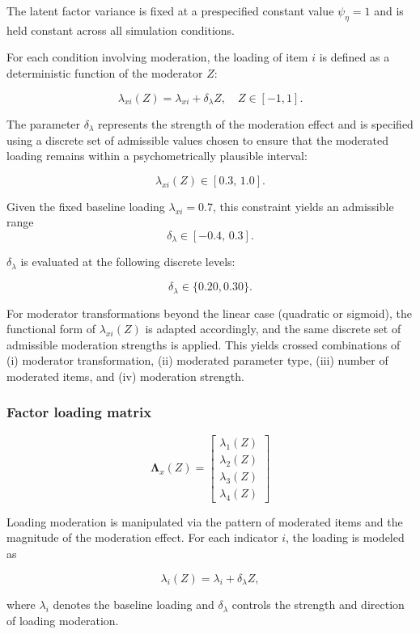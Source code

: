 \documentclass[
  man,
  floatsintext]{apa7}
\begin{document}
The latent factor variance is fixed at a prespecified constant value
\(\psi_{\eta}= 1\) and is held constant across all simulation
conditions.

For each condition involving moderation, the loading of item \(i\) is
defined as a deterministic function of the moderator \(Z\):

\[
\lambda_{xi}(Z) = \lambda_{xi} + \delta_{\lambda} Z,
\quad Z \in [-1, 1].
\]

The parameter \(\delta_{\lambda}\) represents the strength of the
moderation effect and is specified using a discrete set of admissible
values chosen to ensure that the moderated loading remains within a
psychometrically plausible interval:

\[
\lambda_{xi}(Z) \in [0.3,\, 1.0].
\]

Given the fixed baseline loading \(\lambda_{xi}=0.7\), this constraint
yields an admissible range \[
\delta_{\lambda} \in [-0.4,\, 0.3].
\]

\(\delta_{\lambda}\) is evaluated at the following discrete levels:

\[
\delta_\lambda\in\{0.20,0.30\}.
\]

For moderator transformations beyond the linear case (quadratic or
sigmoid), the functional form of \(\lambda_{xi}(Z)\) is adapted
accordingly, and the same discrete set of admissible moderation
strengths is applied. This yields crossed combinations of (i) moderator
transformation, (ii) moderated parameter type, (iii) number of moderated
items, and (iv) moderation strength.

\subsubsection{Factor loading matrix}\label{factor-loading-matrix}

\[
\boldsymbol{\Lambda}_x(Z) =
\begin{bmatrix}
\lambda_1(Z) \\
\lambda_2(Z) \\
\lambda_3(Z)\\
\lambda_4(Z)
\end{bmatrix}
\]

Loading moderation is manipulated via the pattern of moderated items and
the magnitude of the moderation effect. For each indicator \(i\), the
loading is modeled as

\[
\lambda_i(Z) = \lambda_i + \delta_{\lambda} Z,
\]

where \(\lambda_i\) denotes the baseline loading and
\(\delta_{\lambda}\) controls the strength and direction of loading
moderation.
\end{document}
